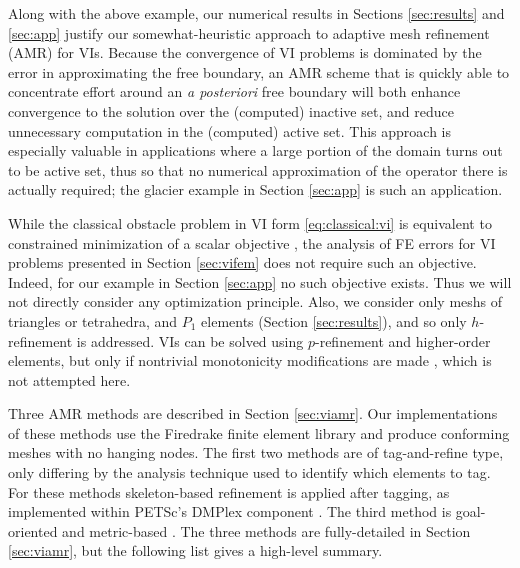 \documentclass[]{interact}
\theoremstyle{plain}%
\theoremstyle{definition}
\theoremstyle{remark}
\begin{document}
Along with the above example, our numerical results in Sections \ref{sec:results} and \ref{sec:app} justify our somewhat-heuristic approach to adaptive mesh refinement (AMR) for VIs.  Because the convergence of VI problems is dominated by the error in approximating the free boundary, an AMR scheme that is quickly able to concentrate effort around an \emph{a posteriori} free boundary will both enhance convergence to the solution over the (computed) inactive set, and reduce unnecessary computation in the (computed) active set.  This approach is especially valuable in applications where a large portion of the domain turns out to be active set, thus so that no numerical approximation of the operator there is actually required; the glacier example in Section \ref{sec:app} is such an application.

While the classical obstacle problem in VI form \eqref{eq:classical:vi} is equivalent to constrained minimization of a scalar objective \cite{KinderlehrerStampacchia1980}, the analysis of FE errors for VI problems presented in Section \ref{sec:vifem} does not require such an objective.  Indeed, for our example in Section \ref{sec:app} no such objective exists.  Thus we will not directly consider any optimization principle.  Also, we consider only meshs of triangles or tetrahedra, and $P_1$ elements (Section \ref{sec:results}), and so only $h$-refinement is addressed.  VIs can be solved using $p$-refinement and higher-order elements, but only if nontrivial monotonicity modifications are made \cite{KeithSurowiec2024}, which is not attempted here.

Three AMR methods are described in Section \ref{sec:viamr}.  Our implementations of these methods use the Firedrake finite element library and produce conforming meshes with no hanging nodes.  The first two methods are of tag-and-refine type, only differing by the analysis technique used to identify which elements to tag.  For these methods skeleton-based refinement \cite{PlazaCarey2000} is applied after tagging, as implemented within PETSc's DMPlex component \cite{petsc-user-ref}.  The third method is goal-oriented and metric-based \cite{Wallworketal2020}.  The three methods are fully-detailed in Section \ref{sec:viamr}, but the following list gives a high-level summary.
\end{document}
